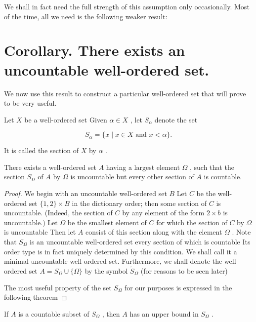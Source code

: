 We shall in fact need the full strength of this assumption only occasionally. Most of the time, all we need is the following weaker result:

\section*{Corollary. There exists an uncountable well-ordered set.}

We now use this result to construct a particular well-ordered set that will prove to be very useful.

\begin{definition} Let \(X\) be a well-ordered set Given \(\alpha  \in  X\) , let \({S}_{\alpha }\) denote the set

\[
{S}_{\alpha } = \{ x \mid  x \in  X\text{ and }x < \alpha \} .
\]

It is called the section of \(X\) by \(\alpha\) .
\end{definition}

\begin{lemma} There exists a well-ordered set \(A\) having a largest element \(\Omega\) , such that the section \({S}_{\Omega }\) of \(A\) by \(\Omega\) is uncountable but every other section of \(A\) is countable.
\end{lemma}

\begin{proof}We begin with an uncountable well-ordered set \(B\) Let \(C\) be the well-ordered set \(\{ 1,2\}  \times  B\) in the dictionary order; then some section of \(C\) is uncountable. (Indeed, the section of \(C\) by any element of the form \(2 \times  b\) is uncountable.) Let \(\Omega\) be the smallest element of \(C\) for which the section of \(C\) by \(\Omega\) is uncountable Then let \(A\) consist of this section along with the element \(\Omega\) .
Note that \({S}_{\Omega }\) is an uncountable well-ordered set every section of which is countable Its order type is in fact uniquely determined by this condition. We shall call it a minimal uncountable well-ordered set. Furthermore, we shall denote the well-ordered set \(A = {S}_{\Omega } \cup  \{ \Omega \}\) by the symbol \({\widetilde{S}}_{\Omega }\) (for reasons to be seen later)

The most useful property of the set \({S}_{\Omega }\) for our purposes is expressed in the following theorem
\end{proof}
\begin{theorem} If \(A\) is a countable subset of \({S}_{\Omega }\) , then \(A\) has an upper bound in \({S}_{\Omega }\) .
\end{theorem}

